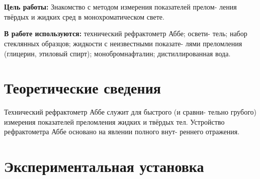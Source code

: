 \documentclass{letask}
\begin{document}
	
	
\begin{flushright}
	\textit{}\\
	\textit{}\\
\end{flushright}


\textbf{Цель работы:} Знакомство с методом измерения показателей прелом- ления твёрдых и жидких сред в монохроматическом свете.

\textbf{В работе используются:} технический рефрактометр Аббе; освети- тель; набор стеклянных образцов; жидкости с неизвестными показате- лями преломления (глицерин, этиловый спирт); монобромнафталин; дистиллированная вода.

\section*{Теоретические сведения}

Технический рефрактометр Аббе служит для быстрого (и сравни- тельно грубого) измерения показателей преломления жидких и твёрдых тел. Устройство рефрактометра Аббе основано на явлении полного внут- реннего отражения.



\section*{Экспериментальная установка}

\end{document}
